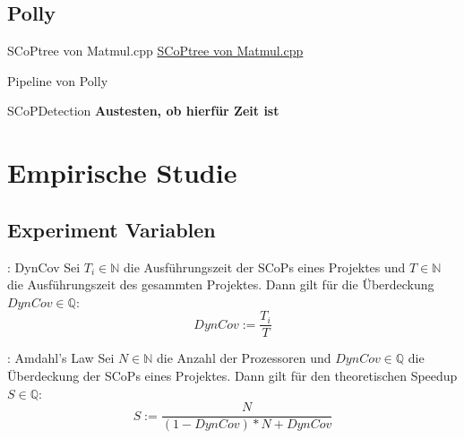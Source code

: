 \documentclass[aspectratio=169, xcolor=dvipsnames]{beamer}
\newcommand{\draftnote}[1]{{\color{red} \textbf{#1}}}
\begin{document}
\subsection{Polly}
\begin{frame}{SCoPtree von Matmul.cpp}
    \href{run:./gfx/matmulScops.png}{SCoPtree von Matmul.cpp}
\end{frame}
\begin{frame}{Pipeline von Polly}
    \begin{figure}[H]
        \centering
        \label{fig:pollyPipeline}
    \end{figure}
\end{frame}
\begin{frame}{SCoPDetection}
    \draftnote{Austesten, ob hierfür Zeit ist}
\end{frame}

\section{Empirische Studie}
\subsection{Experiment Variablen}
\begin{frame}{\subsecname: DynCov}
    Sei \(T_i\in\mathbb{N}\) die Ausführungszeit der SCoPs eines Projektes und \(T\in\mathbb{N}\) die Ausführungszeit des gesammten Projektes. Dann gilt für die Überdeckung \(DynCov\in\mathbb{Q}\):
    \Huge{\[DynCov := \frac{T_i}{T}\]}
\end{frame}
\begin{frame}{\subsecname: Amdahl's Law}
    Sei \(N\in\mathbb{N}\) die Anzahl der Prozessoren und \(DynCov\in\mathbb{Q}\) die Überdeckung der SCoPs eines Projektes. Dann gilt für den theoretischen Speedup \(S\in\mathbb{Q}\):
    \Huge{\[S := \frac{N}{(1-DynCov)*N+DynCov}\]}
\end{frame}
\end{document}
